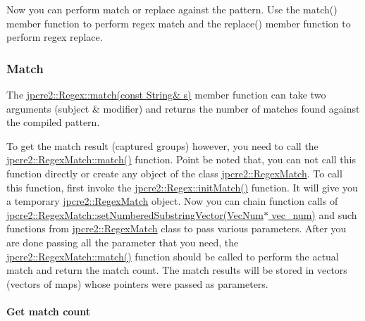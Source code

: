 Now you can perform match or replace against the pattern. Use the {\ttfamily match()} member function to perform regex match and the {\ttfamily replace()} member function to perform regex replace.\hypertarget{index_match}{}\subsubsection{Match}\label{index_match}
The {\ttfamily \hyperlink{classjpcre2_1_1Regex_a9ffbb6aa54cb97125f1b4211bc1d09a5_a9ffbb6aa54cb97125f1b4211bc1d09a5}{jpcre2\+::\+Regex\+::match(const String\& s)}} member function can take two arguments (subject \& modifier) and returns the number of matches found against the compiled pattern.

To get the match result (captured groups) however, you need to call the {\ttfamily \hyperlink{classjpcre2_1_1RegexMatch_a5868aef3a146594ea1ebef34d122bb33_a5868aef3a146594ea1ebef34d122bb33}{jpcre2\+::\+Regex\+Match\+::match()}} function. Point be noted that, you can not call this function directly or create any object of the class {\ttfamily \hyperlink{classjpcre2_1_1RegexMatch}{jpcre2\+::\+Regex\+Match}}. To call this function, first invoke the {\ttfamily \hyperlink{classjpcre2_1_1Regex_a519b0915bf1163c6ce6a4d674b30cfcd_a519b0915bf1163c6ce6a4d674b30cfcd}{jpcre2\+::\+Regex\+::init\+Match()}} function. It will give you a temporary {\ttfamily \hyperlink{classjpcre2_1_1RegexMatch}{jpcre2\+::\+Regex\+Match}} object. Now you can chain function calls of {\ttfamily \hyperlink{classjpcre2_1_1RegexMatch_a2c7efe1ec2e13827f670db4ecedcd0a0_a2c7efe1ec2e13827f670db4ecedcd0a0}{jpcre2\+::\+Regex\+Match\+::set\+Numbered\+Substring\+Vector(\+Vec\+Num$\ast$ vec\+\_\+num)}} and such functions from {\ttfamily \hyperlink{classjpcre2_1_1RegexMatch}{jpcre2\+::\+Regex\+Match}} class to pass various parameters. After you are done passing all the parameter that you need, the {\ttfamily \hyperlink{classjpcre2_1_1RegexMatch_a5868aef3a146594ea1ebef34d122bb33_a5868aef3a146594ea1ebef34d122bb33}{jpcre2\+::\+Regex\+Match\+::match()}} function should be called to perform the actual match and return the match count. The match results will be stored in vectors (vectors of maps) whose pointers were passed as parameters.\hypertarget{index_simple-match-count}{}\paragraph{Get match count}\label{index_simple-match-count}

